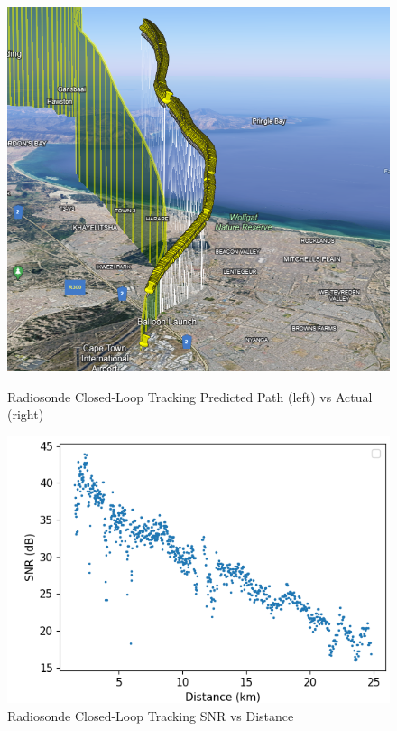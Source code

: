 \begin{figure}[!htb]
  \begin{minipage}{.4\textwidth}
    \centering
    \includegraphics[width=0.98\linewidth]{radiosondePredictedVsActual}
    \caption{Radiosonde Closed-Loop Tracking Predicted Path (left) vs Actual (right)}
    \label{fig:radiosondePredictedVsActual}
  \end{minipage}
  \begin{minipage}{.6\textwidth}
    \centering
    \includegraphics[width=0.98\linewidth]{radiosondeSnr}
    \caption{Radiosonde Closed-Loop Tracking SNR vs Distance}
    \label{fig:radiosondeSnr}
  \end{minipage}
\end{figure}